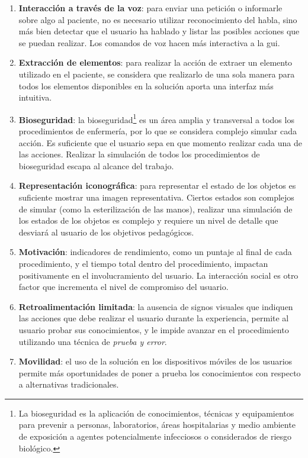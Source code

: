 \begin{enumerate}[\bfseries H1.:]

\item \textbf{Interacción a través de la voz}: para enviar una petición o
    informarle sobre algo al paciente, no es necesario utilizar reconocimiento
    del habla, sino más bien detectar que el usuario ha hablado y listar las posibles
    acciones que se puedan realizar. Los comandos de voz hacen más interactiva a
    la \gls{gui}.
    
\item \textbf{Extracción de elementos}: para realizar la acción de extraer un
    elemento utilizado en el paciente, se considera que realizarlo de una sola
    manera para todos los elementos disponibles en la solución aporta una
    interfaz más intuitiva.

\item \textbf{Bioseguridad}: la bioseguridad\footnote{La bioseguridad es la
        aplicación de conocimientos, técnicas y equipamientos para prevenir a
        personas, laboratorios, áreas hospitalarias y medio ambiente de
        exposición a agentes potencialmente infecciosos o considerados de riesgo
        biológico\cite{world2005manual}.} es un área amplia y transversal a
    todos los procedimientos de enfermería, por lo que se considera complejo
    simular cada acción. Es suficiente que el usuario sepa en que momento
    realizar cada una de las acciones. Realizar la simulación de todos los
    procedimientos de bioseguridad escapa al alcance del trabajo.

\item \textbf{Representación iconográfica}: para representar el estado de los
    objetos es suficiente mostrar una imagen representativa. Ciertos estados son
    complejos de simular (como la esterilización de las manos), realizar una
    simulación de los estados de los objetos es complejo y requiere un nivel de
    detalle que desviará al usuario de los objetivos pedagógicos.
    
\item \textbf{Motivación}: indicadores de rendimiento, como un puntaje al final
    de cada procedimiento, y el tiempo total dentro del procedimiento, impactan
    positivamente en el involucramiento del usuario. La interacción social es
    otro factor que incrementa el nivel de compromiso del usuario.

\item \textbf{Retroalimentación limitada}: la ausencia de signos visuales que
    indiquen las acciones que debe realizar el usuario durante la experiencia,
    permite al usuario probar sus conocimientos, y le impide avanzar en
    el procedimiento utilizando una técnica de \emph{prueba y error}.

\item \textbf{Movilidad}: el uso de la solución en los dispositivos móviles de
    los usuarios permite más oportunidades de poner a prueba los conocimientos
    con respecto a alternativas tradicionales.

\end{enumerate}

